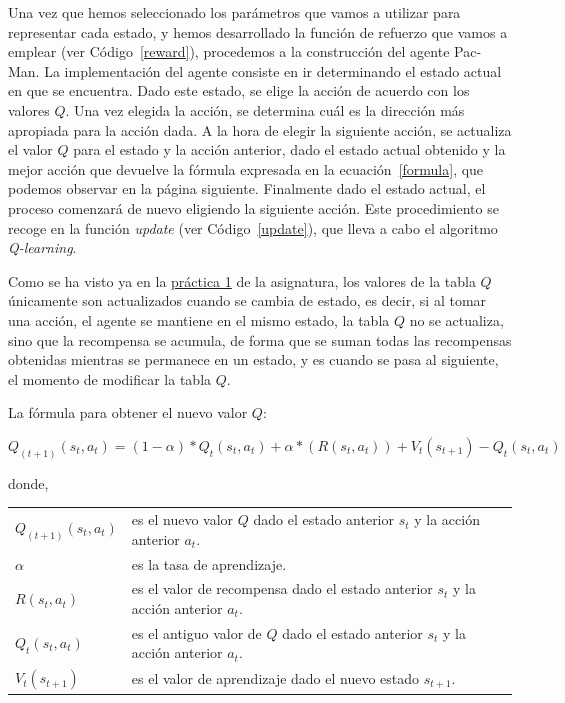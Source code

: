 \documentclass[11pt]{exam}
\makeatletter
\newenvironment{conditions}
{\par\vspace{\abovedisplayskip}\noindent\begin{tabular}{>{$}l<{$} @{${}\:{}$} l}}
	{\end{tabular}\par\vspace{\belowdisplayskip}}
\makeatother
\begin{document}
Una vez que hemos seleccionado los parámetros que vamos a utilizar para representar cada estado, y hemos desarrollado la función de refuerzo que vamos a emplear (ver Código~\ref{reward}), procedemos a la construcción del agente Pac-Man. La implementación del agente consiste en ir determinando el estado actual en que se encuentra. Dado este estado, se elige la acción de acuerdo con los valores $Q$. Una vez elegida la acción, se determina cuál es la dirección más apropiada para la acción dada. A la hora de elegir la siguiente acción, se actualiza el valor $Q$ para el estado y la acción anterior, dado el estado actual obtenido y la mejor acción que devuelve la fórmula expresada en la ecuación~\ref{formula}, que podemos observar en la página siguiente. Finalmente dado el estado actual, el proceso comenzará de nuevo eligiendo la siguiente acción. Este procedimiento se recoge en la función \textit{update} (ver Código~\ref{update}), que lleva a cabo el algoritmo \textit{Q-learning}. 

Como se ha visto ya en la \href{https://poliformat.upv.es/portal/site/ESP_0_2835/tool/c07b745a-0cfd-44f0-a7a2-9bb22f80c3f7?panel=Main}{práctica 1} de la asignatura, los valores de la tabla $Q$ únicamente son actualizados cuando se cambia de estado, es decir, si al tomar una acción, el agente se mantiene en el mismo estado, la tabla $Q$ no se actualiza, sino que la recompensa se acumula, de forma que se suman todas las recompensas obtenidas mientras se permanece en un estado, y es cuando se pasa al siguiente, el momento de modificar la tabla $Q$. 

\newpage

La fórmula para obtener el nuevo valor $Q$:

\begin{equation}\label{formula}
	Q_{(t+1)}(s_{t},a_{t}) = (1-\alpha) * Q_{t}(s_{t},a_{t}) + \alpha * (R(s_{t},a_{t})) + V_{t}(s_{t+1}) - Q_{t}(s_{t},a_{t})
\end{equation}

donde,

\begin{conditions}
	Q_{(t+1)}(s_{t},a_{t}) & es el nuevo valor $Q$ dado el estado anterior $s_{t}$ y la acción anterior $a_{t}$. \\
	\alpha & es la tasa de aprendizaje. \\
	R(s_{t},a_{t}) & es el valor de recompensa dado el estado anterior $s_{t}$ y la acción anterior $a_{t}$.	\\
	Q_{t}(s_{t},a_{t}) & es el antiguo valor de $Q$ dado el estado anterior $s_{t}$ y la acción anterior $a_{t}$.	\\
	V_{t}(s_{t+1}) & es el valor de aprendizaje dado el nuevo estado $s_{t+1}$.
\end{conditions}
\end{document}
